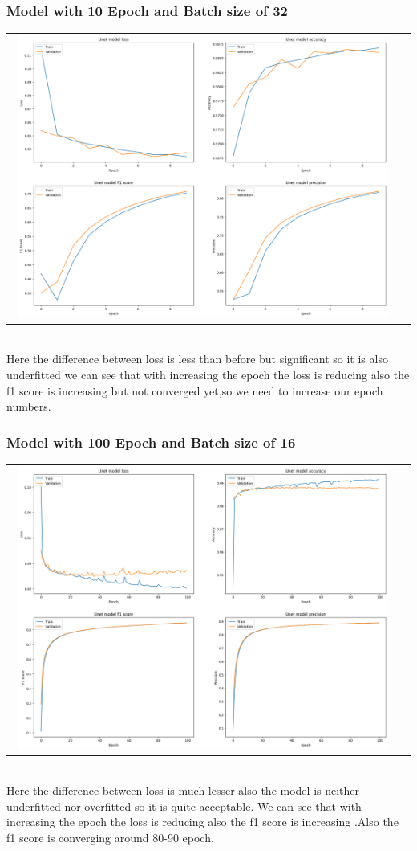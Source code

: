 \documentclass[12pt,a4paper]{report}
\begin{document}
\subsubsection{Model with 10 Epoch and Batch size of 32  }
		    \begin{tabular}{c c}
 \includegraphics[width=0.97\textwidth]{10epoch}
    \end{tabular}
    \\
Here the difference between loss is less than before but significant so it is also underfitted we can see that with increasing the epoch the loss is reducing also the f1 score is increasing but not converged yet,so we need to increase our epoch numbers.

\subsubsection{Model with 100 Epoch and Batch size of 16  }
		    \begin{tabular}{c c}
 \includegraphics[width=0.97\textwidth]{100epoch}
    \end{tabular}
    \\
Here the difference between loss is much lesser also the model is neither underfitted nor overfitted so it is quite acceptable. We can see that with increasing the epoch the loss is reducing also the f1 score is increasing .Also the f1 score is converging around 80-90 epoch.
\end{document}

